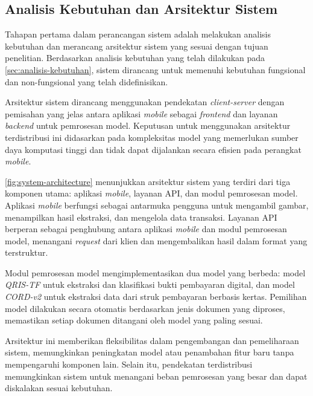 \subsection{Analisis Kebutuhan dan Arsitektur Sistem}
\label{subsec:analisis-kebutuhan-arsitektur}

Tahapan pertama dalam perancangan sistem adalah melakukan analisis kebutuhan dan merancang arsitektur sistem yang sesuai dengan tujuan penelitian. Berdasarkan analisis kebutuhan yang telah dilakukan pada \autoref{sec:analisis-kebutuhan}, sistem dirancang untuk memenuhi kebutuhan fungsional dan non-fungsional yang telah didefinisikan.

Arsitektur sistem dirancang menggunakan pendekatan \textit{client-server} dengan pemisahan yang jelas antara aplikasi \textit{mobile} sebagai \textit{frontend} dan layanan \textit{backend} untuk pemrosesan model. Keputusan untuk menggunakan arsitektur terdistribusi ini didasarkan pada kompleksitas model \donut{} yang memerlukan sumber daya komputasi tinggi dan tidak dapat dijalankan secara efisien pada perangkat \textit{mobile}.


\autoref{fig:system-architecture} menunjukkan arsitektur sistem yang terdiri dari tiga komponen utama: aplikasi \textit{mobile}, layanan API, dan modul pemrosesan model. Aplikasi \textit{mobile} berfungsi sebagai antarmuka pengguna untuk mengambil gambar, menampilkan hasil ekstraksi, dan mengelola data transaksi. Layanan API berperan sebagai penghubung antara aplikasi \textit{mobile} dan modul pemrosesan model, menangani \textit{request} dari klien dan mengembalikan hasil dalam format yang terstruktur.

Modul pemrosesan model mengimplementasikan dua model \donut{} yang berbeda: model \textit{QRIS-TF} untuk ekstraksi dan klasifikasi bukti pembayaran digital, dan model \textit{CORD-v2} untuk ekstraksi data dari struk pembayaran berbasis kertas. Pemilihan model dilakukan secara otomatis berdasarkan jenis dokumen yang diproses, memastikan setiap dokumen ditangani oleh model yang paling sesuai.

Arsitektur ini memberikan fleksibilitas dalam pengembangan dan pemeliharaan sistem, memungkinkan peningkatan model atau penambahan fitur baru tanpa mempengaruhi komponen lain. Selain itu, pendekatan terdistribusi memungkinkan sistem untuk menangani beban pemrosesan yang besar dan dapat diskalakan sesuai kebutuhan.
